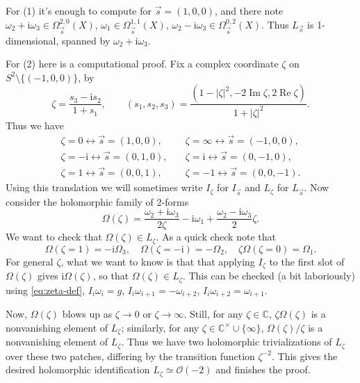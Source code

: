 \documentclass[12pt,letterpaper,reqno]{article}
\numberwithin{equation}{section}
\newcommand{\cO}{\ensuremath{\mathcal O}}
\newcommand{\C}{\ensuremath{\mathbb C}}
\newcommand{\I}{{\mathrm i}}
\newcommand{\abs}[1]{\lvert#1\rvert}
\newcommand{\mmaref}[1]{}
\DeclareMathOperator{\im}{Im}
\DeclareMathOperator{\re}{Re}
\begin{document}
\begin{pf}
For (1) it's enough to compute for $\vec{s} = (1,0,0)$, and there note
$\omega_2 + \I \omega_3 \in \Omega^{2,0}_{\vec{s}}(X)$, $\omega_1 \in \Omega^{1,1}_{\vec{s}}(X)$,
$\omega_2 - \I \omega_3 \in \Omega^{0,2}_{\vec{s}}(X)$. Thus $L_{\vec s}$ is 1-dimensional,
spanned by $\omega_2 + \I \omega_3$.

For (2) here is a computational proof.
Fix a complex coordinate $\zeta$
on $S^2 \setminus \{ (-1,0,0) \}$, by
\begin{equation} \label{eq:zeta-def}
 \zeta = \frac{s_3 - \I s_2}{1 + s_1}, \qquad (s_1, s_2, s_3) = \frac{(1 - \abs{\zeta}^2, -2 \im \zeta, 2 \re \zeta)}{1+\abs{\zeta}^2}.
\end{equation}
Thus we have
\begin{align}
  \zeta = 0 \leftrightarrow \vec s = (1,0,0), \quad & \zeta = \infty \leftrightarrow \vec s = (-1,0,0), \\
  \zeta = -\I \leftrightarrow \vec s = (0,1,0), \quad & \zeta = \I \leftrightarrow \vec s = (0,-1,0), \\
  \zeta = 1 \leftrightarrow \vec s = (0,0,1), \quad & \zeta = -1 \leftrightarrow \vec s = (0,0,-1).
\end{align}
Using this translation we will sometimes write
$I_\zeta$ for $I_{\vec s}$ and $L_\zeta$ for $L_{\vec s}$.
Now consider the holomorphic family of 2-forms
\begin{equation} \label{eq:hol-symp-family}
  \Omega(\zeta) = \frac{\omega_2 + \I \omega_3}{2\zeta} - \I\omega_1 + \frac{\omega_2 - \I \omega_3}{2} \zeta.
\end{equation}
We want to check that $\Omega(\zeta) \in L_\zeta$.
As a quick check note that
\begin{equation}
  \Omega(\zeta=1) = -\I \Omega_3, \quad \Omega(\zeta=-\I) = - \Omega_2, \quad \zeta \Omega(\zeta=0) = \Omega_1.
\end{equation}
For general $\zeta$, what we want to know is that
that applying $I_\zeta$ to the first slot of $\Omega(\zeta)$ gives
$\I \Omega(\zeta)$, so that $\Omega(\zeta) \in L_\zeta$.
This can be checked (a bit laboriously) 
using \eqref{eq:zeta-def}, $I_i \omega_i = g$,
$I_i \omega_{i+1} = -\omega_{i+2}$, $I_i \omega_{i+2} = \omega_{i+1}$.

Now, $\Omega(\zeta)$ blows up as $\zeta \to 0$ or
$\zeta \to \infty.$
Still, for any $\zeta \in \C$, $\zeta \Omega(\zeta)$ is
a nonvanishing element of $L_\zeta$;
similarly, for any $\zeta \in \C^\times \cup \{\infty\}$,
$\Omega(\zeta) / \zeta$ is a nonvanishing element of $L_\zeta$.
Thus we have two holomorphic trivializations of $L_\zeta$ over
these two patches, differing by the transition function $\zeta^{-2}$.
This gives the desired holomorphic identification
$L_\zeta \simeq \cO(-2)$ and finishes the proof.
\end{pf}
\end{document}
